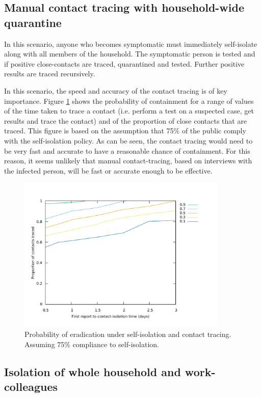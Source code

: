 \documentclass{article}
\begin{document}
\subsection{Manual contact tracing with household-wide quarantine}

In this scenario, anyone who becomes symptomatic must immediately self-isolate along with all members of the household. The symptomatic person is tested and if positive close-contacts are traced, quarantined and tested. Further positive results are traced recursively.

In this scenario, the speed and accuracy of the contact tracing is of key importance. Figure \ref{tracingContour} shows the probability of containment for a range of values of the time taken to trace a contact (i.e. perform a test on a suspected case, get results and trace the contact) and of the proportion of close contacts that are traced. This figure is based on the assumption that 75\% of the public comply with the self-isolation policy. As can be seen, the contact tracing would need to be very fast and accurate to have a reasonable chance of containment. For this reason, it seems unlikely that manual contact-tracing, based on interviews with the infected person, will be fast or accurate enough to be effective.

\begin{figure}
\begin{center}
\includegraphics[width = 10cm]{tracingContour.pdf}
\end{center}
\caption{Probability of eradication under self-isolation and contact tracing. Assuming 75\% compliance to self-isolation.}
\label{tracingContour}
\end{figure}

\subsection{Isolation of whole household and work-colleagues}
\end{document}
